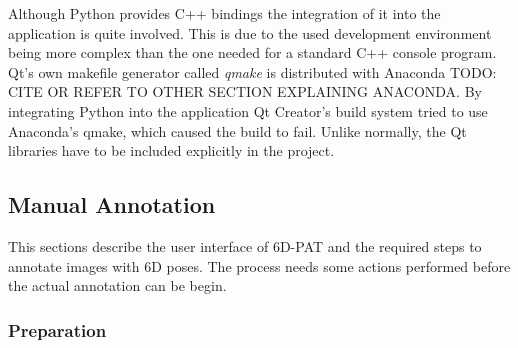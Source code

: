 Although Python provides C++ bindings the integration of it into the application is quite involved. This is due to the used development environment being more complex than the one needed for a standard C++ console program. Qt's own makefile generator called \textit{qmake} is distributed with Anaconda TODO: CITE OR REFER TO OTHER SECTION EXPLAINING ANACONDA. By integrating Python into the application Qt Creator's build system tried to use Anaconda's qmake, which caused the build to fail. Unlike normally, the Qt libraries have to be included explicitly in the project.

\subsection{Manual Annotation} 

This sections describe the user interface of 6D-PAT and the required steps to annotate images with 6D poses. The process needs some actions performed before the actual annotation can be begin. 

\subsubsection{Preparation}

